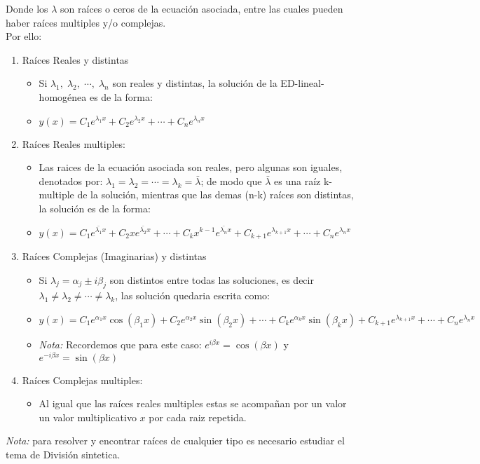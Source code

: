 Donde los \(\displaystyle \lambda\) son raíces o ceros de la ecuación asociada, entre las cuales pueden haber raíces multiples y/o complejas.\\
Por ello:
\begin{enumerate}
  \item Raíces Reales y distintas
  \begin{itemize}
    \item Si \(\displaystyle \lambda_{1},\;\lambda_{2},\;\cdots,\;\lambda_{n}\) son reales y distintas, la solución de la ED-lineal-homogénea es de la forma:
    \item \(\displaystyle y(x)=C_{1}e^{\lambda_{1}x}+C_{2}e^{\lambda_{2}x}+\cdots+C_{n}e^{\lambda_{n}x}\)
  \end{itemize}
  \item Raíces Reales multiples:
  \begin{itemize}
    \item Las raices de la ecuación asociada son reales, pero algunas son iguales, denotados por: \(\displaystyle \lambda_{1}=\lambda_{2}=\cdots=\lambda_{k}=\bar{\lambda}\); de modo que \(\displaystyle \bar{\lambda}\) es una raíz k-multiple de la solución, mientras que las demas (n-k) raíces son distintas, la solución es de la forma:
    \item \(\displaystyle y(x)=C_{1}e^{\bar{\lambda_{1}}x}+C_{2}xe^{\bar{\lambda_{2}}x}+\cdots+C_{k}x^{k-1}e^{\bar{\lambda_{n}}x}+C_{k+1}e^{\lambda_{k+1}x}+\cdots+C_{n}e^{\lambda_{n}x}\)
  \end{itemize}
  \item Raíces Complejas (Imaginarias) y distintas
  \begin{itemize}
    \item Si \(\displaystyle \lambda_{j}=\alpha_{j}\pm i\beta_{j}\) son distintos entre todas las soluciones, es decir  \(\displaystyle\lambda_{1}\neq\lambda_{2}\neq\cdots\neq\lambda_{k}\), las solución quedaria escrita como:
    \item \(\displaystyle y(x)=C_{1}e^{\alpha_{1}x}\cos\left(\beta_{1}x\right)+C_{2}e^{\alpha_{2}x}\sin\left(\beta_{2}x\right) + \cdots + C_{k}e^{\alpha_{k}x}\sin\left(\beta_{k}x\right)+C_{k+1}e^{\lambda_{k+1}x}+\cdots+C_{n}e^{\lambda_{n}x}\)
    \item \textit{Nota:} Recordemos que para este caso: \(\displaystyle e^{i\beta x}=\cos\left(\beta x\right)\) y \(\displaystyle e^{-i\beta x}=\sin\left(\beta x\right)\)
  \end{itemize}
  \item Raíces Complejas multiples:
  \begin{itemize}
    \item Al igual que las raíces reales multiples estas se acompañan por un valor un valor multiplicativo \(\displaystyle x\) por cada raiz repetida.
  \end{itemize}
\end{enumerate}
\textit{Nota:} para resolver y encontrar raíces de cualquier tipo es necesario estudiar el tema de División sintetica.
